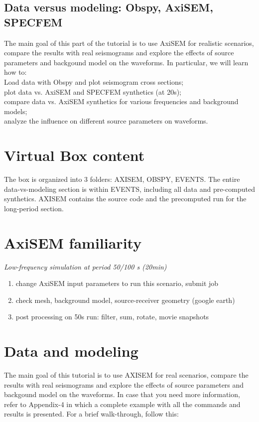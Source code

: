 \documentclass{article}
\begin{document}
\subsection{Data versus modeling: Obspy, AxiSEM, SPECFEM}
The main goal of this part of the tutorial is to use AxiSEM for realistic scenarios, compare the 
results with real seismograms and explore the effects of source parameters and 
backgound model on the waveforms. In particular, we will learn how to:\\
Load data with Obspy and plot seismogram cross sections;\\
plot data vs. AxiSEM and SPECFEM synthetics (at 20s);\\
compare data vs. AxiSEM synthetics for various frequencies and background models;\\
analyze the influence on different source parameters on waveforms.

\section{Virtual Box content}
The box is organized into 3 folders: AXISEM, OBSPY, EVENTS. The entire
data-vs-modeling section is within EVENTS, including all data and pre-computed
synthetics. AXISEM contains the source code and the precomputed run
for the long-period section.

\section{AxiSEM familiarity}
\emph{Low-frequency simulation at period 50/100 s (20min)}
\begin{enumerate}
\item change AxiSEM input parameters to run this scenario, submit job
\item check mesh, background model, source-receiver geometry (google earth)
\item post processing on 50s run: filter, sum, rotate, movie snapshots
\end{enumerate}

\newpage

\section{Data and modeling}
The main goal of this tutorial is to use AXISEM for real scenarios, 
compare the results with real seismograms and explore the effects of source parameters and backgound model on the waveforms. 
In case that you need more information, 
refer to Appendix-4 in which a complete example with all the commands and results is presented.
For a brief walk-through, follow this:
\end{document}
